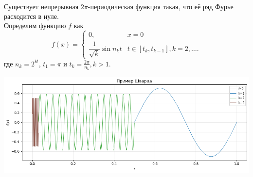 \begin{example}[Шварц]
    Существует непрерывная $2\pi$-периодическая функция такая, что её ряд Фурье расходится в нуле. \\
    Определим функцию $f$ как \[
                                  f(x) =
                                  \begin{cases}
                                      0, & x = 0 \\
                                      \dfrac{1}{\sqrt{k}}\sin n_kt & t \in [t_k, t_{k - 1}], k = 2, \ldots.
                                  \end{cases}
    \]
    где $n_k = 2^{k!}$, $t_1 = \pi$ и $t_k = \frac{2\pi}{n_k}, k > 1$.
    \begin{center}
            \includegraphics[width=1\linewidth]{Pictures/Shwartz.png}
    \end{center}
    

\end{example}
